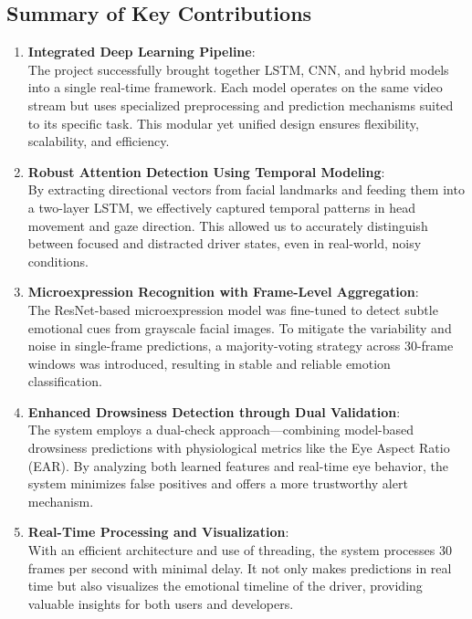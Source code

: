\documentclass[
  letterpaper,
  DIV=11,
  numbers=noendperiod]{scrreport}
\begin{document}
\subsection{Summary of Key
Contributions}\label{summary-of-key-contributions}

\begin{enumerate}
\def\labelenumi{\arabic{enumi}.}
\item
  \textbf{Integrated Deep Learning Pipeline}:\\
  The project successfully brought together LSTM, CNN, and hybrid models
  into a single real-time framework. Each model operates on the same
  video stream but uses specialized preprocessing and prediction
  mechanisms suited to its specific task. This modular yet unified
  design ensures flexibility, scalability, and efficiency.
\item
  \textbf{Robust Attention Detection Using Temporal Modeling}:\\
  By extracting directional vectors from facial landmarks and feeding
  them into a two-layer LSTM, we effectively captured temporal patterns
  in head movement and gaze direction. This allowed us to accurately
  distinguish between focused and distracted driver states, even in
  real-world, noisy conditions.
\item
  \textbf{Microexpression Recognition with Frame-Level Aggregation}:\\
  The ResNet-based microexpression model was fine-tuned to detect subtle
  emotional cues from grayscale facial images. To mitigate the
  variability and noise in single-frame predictions, a majority-voting
  strategy across 30-frame windows was introduced, resulting in stable
  and reliable emotion classification.
\item
  \textbf{Enhanced Drowsiness Detection through Dual Validation}:\\
  The system employs a dual-check approach---combining model-based
  drowsiness predictions with physiological metrics like the Eye Aspect
  Ratio (EAR). By analyzing both learned features and real-time eye
  behavior, the system minimizes false positives and offers a more
  trustworthy alert mechanism.
\item
  \textbf{Real-Time Processing and Visualization}:\\
  With an efficient architecture and use of threading, the system
  processes 30 frames per second with minimal delay. It not only makes
  predictions in real time but also visualizes the emotional timeline of
  the driver, providing valuable insights for both users and developers.
\end{enumerate}
\end{document}
